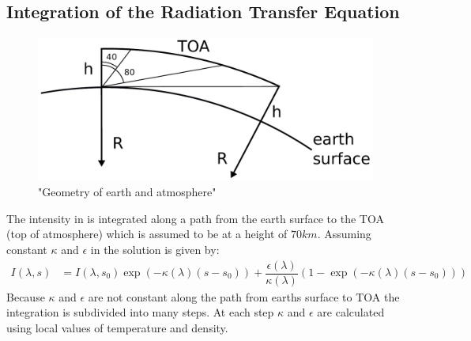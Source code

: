 \subsection{Integration of the Radiation Transfer Equation}

\begin{figure}[ht]
	\includegraphics[width=12cm]{figures/earth_surface_toa.pdf}
	\caption{"Geometry of earth and atmosphere"}
	\label{fig:geometry}
\end{figure}

The intensity in  is integrated along a path from the earth surface to the TOA (top of atmosphere) which is assumed to be at a height of $70 km$. Assuming constant $\kappa$ and $\epsilon$ in  the solution is given by:
\begin{align}
	I(\lambda,s) &= I(\lambda,s_0) \exp( -  \kappa(\lambda) (s-s_0)) + \dfrac{\epsilon(\lambda)}{\kappa(\lambda)} \left(1 - \exp( - \kappa(\lambda) (s-s_0))\right)
\end{align}
Because $\kappa$ and $\epsilon$ are not constant along the path from earths surface to TOA the integration is subdivided into many steps. At each step $\kappa$ and $\epsilon$ are calculated using local values of temperature and density.

